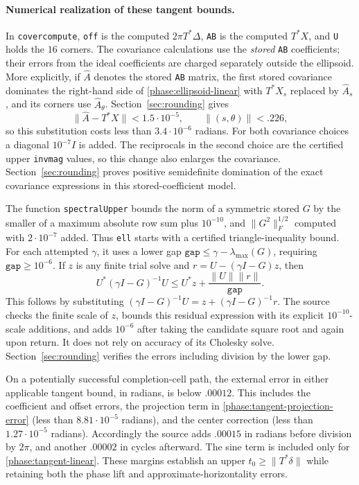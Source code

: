 \paragraph{Numerical realization of these tangent bounds.}
In \texttt{covercompute}, \texttt{off} is the computed
\(2\pi T^*\Delta\), \texttt{AB} is the computed \(T^*X\), and
\texttt{U} holds the \(16\) corners.  The covariance calculations use
the \emph{stored} \texttt{AB} coefficients; their errors from the
ideal coefficients are charged separately outside the ellipsoid.
More explicitly, if \(\widehat A\) denotes the stored
\texttt{AB} matrix, the first stored covariance dominates the
right-hand side of \eqref{phase:ellipsoid-linear} with
\(T^*X_s\) replaced by \(\widehat A_s\), and its corners use
\(\widehat A_\theta\).  Section~\ref{sec:rounding} gives
\[
 \|\widehat A-T^*X\|<1.5\cdot10^{-5},\qquad
 \|(s,\theta)\|<.226,
\]
so this substitution costs less than \(3.4\cdot10^{-6}\) radians.
For both covariance choices a diagonal \(10^{-7}I\) is added.  The
reciprocals in the second choice are the certified upper
\texttt{invmag} values, so this change also enlarges the covariance.
Section~\ref{sec:rounding} proves positive semidefinite domination of
the exact covariance expressions in this stored-coefficient model.

The function \texttt{spectralUpper} bounds the norm of a symmetric
stored \(G\) by the smaller of a maximum absolute row sum plus
\(10^{-10}\), and
\(\|G^2\|_F^{1/2}\) computed with \(2\cdot10^{-7}\) added.  Thus
\texttt{ell} starts with a certified triangle-inequality bound.
For each attempted \(\gamma\), it uses a lower gap
\(\mathtt{gap}\leq\gamma-\lambda_{\max}(G)\), requiring
\(\mathtt{gap}\geq10^{-6}\).  If \(z\) is any finite trial solve and
\(r=U-(\gamma I-G)z\), then
\begin{equation}
 U^*(\gamma I-G)^{-1}U
 \leq U^*z+\frac{\|U\|\|r\|}{\mathtt{gap}}.
 \label{phase:inverse-residual}
\end{equation}
This follows by substituting
\((\gamma I-G)^{-1}U=z+(\gamma I-G)^{-1}r\).
The source checks the finite scale of \(z\), bounds this residual
expression with its explicit \(10^{-10}\)-scale additions, and adds
\(10^{-6}\) after taking the candidate square root and again upon
return.  It does not rely on accuracy of its Cholesky solve.
Section~\ref{sec:rounding} verifies the errors including division by
the lower gap.

On a potentially successful completion-cell path, the external
error in either applicable tangent bound, in radians, is below
\(.00012\).  This includes the coefficient and offset errors, the
projection term in \eqref{phase:tangent-projection-error} (less than
\(8.81\cdot10^{-5}\) radians), and the center correction (less than
\(1.27\cdot10^{-5}\) radians).
Accordingly the source adds \(.00015\) in radians before division
by \(2\pi\), and another \(.00002\) in cycles afterward.  The sine
term is included only for \eqref{phase:tangent-linear}.  These
margins establish an upper \(t_0\geq\|T^*\delta\|\) while retaining
both the phase lift and approximate-horizontality errors.

